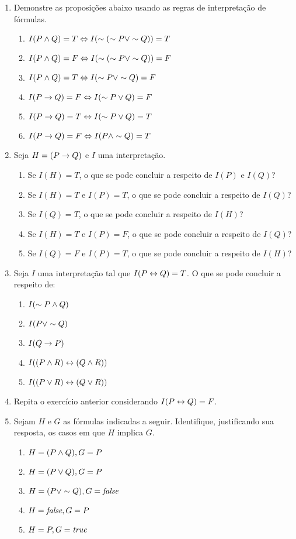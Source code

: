 \begin{enumerate}
  \item Demonstre as proposições abaixo usando as regras de interpretação de fórmulas.
    \begin{enumerate}
      \item $I(P \land Q) = T \Leftrightarrow I(\sim(\sim P \lor \sim Q)) = T$
      \item $I(P \land Q) = F \Leftrightarrow I(\sim(\sim P \lor \sim Q)) = F$
      \item $I(P \land Q) = T \Leftrightarrow I(\sim P \lor \sim Q) = F$
      \item $I(P \rightarrow Q) = F \Leftrightarrow I(\sim P \lor Q) = F$
      \item $I(P \rightarrow Q) = T \Leftrightarrow I(\sim P \lor Q) = T$
      \item $I(P \rightarrow Q) = F \Leftrightarrow I(P \land \sim Q) = T$
    \end{enumerate}
  \item Seja $H = (P \rightarrow Q)$ e $I$ uma interpretação.
    \begin{enumerate}
      \item Se $I(H) = T$, o que se pode concluir a respeito de $I(P)$ e $I(Q)$?
      \item Se $I(H) = T$ e $I(P) = T$, o que se pode concluir a respeito de $I(Q)$?
      \item Se $I(Q) = T$, o que se pode concluir a respeito de $I(H)$?
      \item Se $I(H) = T$ e $I(P) = F$, o que se pode concluir a respeito de $I(Q)$?
      \item Se $I(Q) = F$ e $I(P) = T$, o que se pode concluir a respeito de $I(H)$?
    \end{enumerate}
  \item Seja $I$ uma interpretação tal que $I(P \leftrightarrow Q) = T$. O que se pode concluir a respeito de:
    \begin{enumerate}
      \item $I(\sim P \land Q)$
      \item $I(P \lor \sim Q)$
      \item $I(Q \rightarrow P)$
      \item $I((P \land R) \leftrightarrow (Q \land R))$
      \item $I((P \lor  R) \leftrightarrow (Q \lor  R))$
    \end{enumerate}
  \item Repita o exercício anterior considerando $I(P \leftrightarrow Q) = F$.

  \item Sejam $H$ e $G$ as fórmulas indicadas a seguir. Identifique, justificando sua resposta, os casos em que $H$ implica $G$.
    \begin{enumerate}
      \item $H = (P \land Q), G = P$
      \item $H = (P \lor  Q), G = P$
      \item $H = (P \lor \sim Q), G = \textit{false}$
      \item $H = \textit{false}, G = P$
      \item $H = P, G = \textit{true}$
    \end{enumerate}


\end{enumerate}
